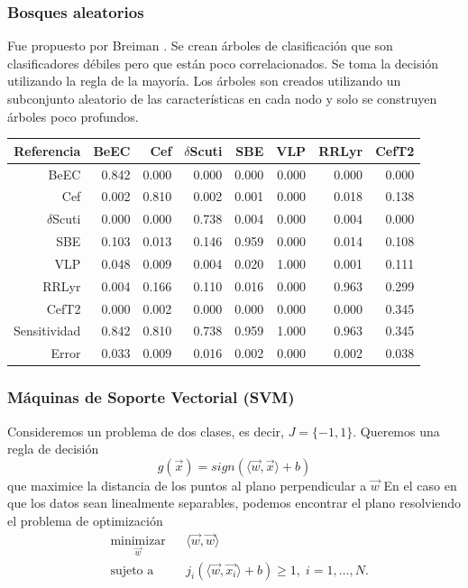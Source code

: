 \documentclass{beamer}
\begin{document}
\begin{frame}
  \frametitle{Bosques aleatorios}
  Fue propuesto por Breiman \cite{breiman_random_2001}. Se crean árboles de clasificación que son clasificadores débiles pero que están poco correlacionados. Se toma la decisión utilizando la regla de la mayoría. Los árboles son creados utilizando un subconjunto aleatorio de las características en cada nodo y solo se construyen árboles poco profundos.
  \begin{table}[ht]
    \centering
    \resizebox{0.7\textwidth}{!} {
      \begin{tabular}{rrrrrrrr}
        \hline
        Referencia & BeEC & Cef & $\delta$Scuti & SBE & VLP & RRLyr & CefT2 \\ 
        \hline
        BeEC & 0.842 & 0.000 & 0.000 & 0.000 & 0.000 & 0.000 & 0.000 \\ 
        Cef & 0.002 & 0.810 & 0.002 & 0.001 & 0.000 & 0.018 & 0.138 \\ 
        $\delta$Scuti & 0.000 & 0.000 & 0.738 & 0.004 & 0.000 & 0.004 & 0.000 \\ 
        SBE & 0.103 & 0.013 & 0.146 & 0.959 & 0.000 & 0.014 & 0.108 \\ 
        VLP & 0.048 & 0.009 & 0.004 & 0.020 & 1.000 & 0.001 & 0.111 \\ 
        RRLyr & 0.004 & 0.166 & 0.110 & 0.016 & 0.000 & 0.963 & 0.299 \\ 
        CefT2 & 0.000 & 0.002 & 0.000 & 0.000 & 0.000 & 0.000 & 0.345 \\
        \hline
        Sensitividad &  0.842 & 0.810 & 0.738 & 0.959 & 1.000 & 0.963 & 0.345 \\
        \hline
        Error & 0.033 & 0.009 & 0.016 & 0.002 & 0.000 & 0.002 & 0.038 \\ 
        \hline
      \end{tabular}
    }
  \end{table}
\end{frame}



\begin{frame}
\frametitle{Máquinas de Soporte Vectorial (SVM)}
Consideremos un problema de dos clases, es decir, $J=\{-1,1\}$. Queremos una regla de decisión 
\begin{equation}
g(\vec{x}) = sign(\langle \vec{w}, \vec{x}\rangle + b)
\end{equation}
que maximice la distancia de los puntos al plano perpendicular a $\vec{w}$
En el caso en que los datos sean linealmente separables, podemos encontrar el plano resolviendo el problema de optimización
\begin{equation*}
\begin{aligned}
& \underset{\vec{w}}{\text{minimizar}}
& & \langle \vec{w}, \vec{w} \rangle \\
& \text{sujeto a}
& & j_i(\langle \vec{w}, \vec{x_i}\rangle + b)\geq 1, \; i = 1, \ldots, N.
\end{aligned}
\end{equation*}
\end{frame}
\end{document}
